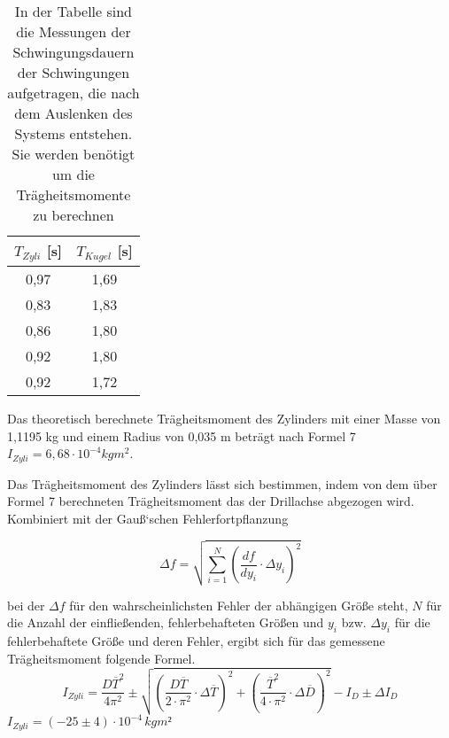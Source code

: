 \documentclass[titlepage = firstcover]{scrartcl}
\begin{document}
      \begin{table}[h]
        \centering
        \caption{In der Tabelle sind die Messungen der Schwingungsdauern der Schwingungen aufgetragen, die nach dem Auslenken des Systems entstehen. Sie werden benötigt um die Trägheitsmomente zu berechnen}
        \label{tab:Tabelle_3}

        \begin{tabular}{c c}
          \toprule
          {$T_{Zyli}$ [s]} & {$T_{Kugel}$ [s]} \\
          \midrule
          0,97 & 1,69 \\
          0,83 & 1,83 \\
          0,86 & 1,80 \\
          0,92 & 1,80 \\
          0,92 & 1,72 \\
          \bottomrule
        \end{tabular}
      \end{table}
      
      Das theoretisch berechnete Trägheitsmoment des Zylinders mit einer Masse von 1,1195 kg und einem Radius von 0,035 m beträgt nach Formel 7 
      $I_{Zyli} = 6,68 \cdot 10^{-4} kgm^2$. \newline
      
      Das Trägheitsmoment des Zylinders lässt sich bestimmen, indem von dem über Formel 7 berechneten Trägheitsmoment das der Drillachse abgezogen wird. Kombiniert
      mit der Gauß`schen Fehlerfortpflanzung 
      
      \begin{equation*}
        \Delta f = \sqrt{\sum_{i=1}^N (\frac{df}{dy_i}\cdot \Delta y_i)^2}
      \end{equation*}

      bei der $\Delta f$ für den wahrscheinlichsten Fehler der abhängigen Größe steht, $N$ für die Anzahl der einfließenden, fehlerbehafteten Größen und 
      $y_i$ bzw. $\Delta y_i$ für die fehlerbehaftete Größe und deren Fehler, ergibt sich für das gemessene Trägheitsmoment folgende Formel.
      \begin{equation*}
        I_{Zyli} = \frac{D\overline{T}^2}{4\pi^2} \pm \sqrt{(\frac{D\overline{T}}{2\cdot \pi^2} \cdot \Delta \overline{T})^2 + (\frac{\overline{T}^2}{4 \cdot \pi^2} \cdot \Delta \overline{D})^2} - I_D \pm \Delta I_D
      \end{equation*}
      $I_{Zyli} = (-25 \pm 4) \cdot 10^{-4} \, kgm²$ \newline
\end{document}
